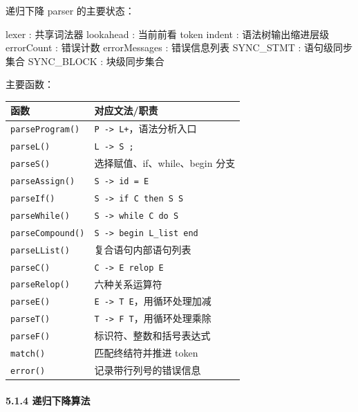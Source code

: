 \documentclass[
  a4paper,
  fontset=none,
]{ctexart}
\newenvironment{Shaded}{}{}
\newcommand{\NormalTok}[1]{#1}
\begin{document}
递归下降 parser 的主要状态：

\begin{Shaded}
\begin{Highlighting}[]
\NormalTok{lexer          : 共享词法器}
\NormalTok{lookahead      : 当前前看 token}
\NormalTok{indent         : 语法树输出缩进层级}
\NormalTok{errorCount     : 错误计数}
\NormalTok{errorMessages  : 错误信息列表}
\NormalTok{SYNC\_STMT      : 语句级同步集合}
\NormalTok{SYNC\_BLOCK     : 块级同步集合}
\end{Highlighting}
\end{Shaded}

主要函数：

\begin{longtable}[]{@{}ll@{}}
\toprule\noalign{}
函数 & 对应文法/职责 \\
\midrule\noalign{}
\endhead
\bottomrule\noalign{}
\endlastfoot
\texttt{parseProgram()} &
\texttt{P\ -\textgreater{}\ L+}，语法分析入口 \\
\texttt{parseL()} & \texttt{L\ -\textgreater{}\ S\ ;} \\
\texttt{parseS()} & 选择赋值、if、while、begin 分支 \\
\texttt{parseAssign()} & \texttt{S\ -\textgreater{}\ id\ =\ E} \\
\texttt{parseIf()} &
\texttt{S\ -\textgreater{}\ if\ C\ then\ S\ S\textquotesingle{}} \\
\texttt{parseWhile()} & \texttt{S\ -\textgreater{}\ while\ C\ do\ S} \\
\texttt{parseCompound()} &
\texttt{S\ -\textgreater{}\ begin\ L\_list\ end} \\
\texttt{parseLList()} & 复合语句内部语句列表 \\
\texttt{parseC()} & \texttt{C\ -\textgreater{}\ E\ relop\ E} \\
\texttt{parseRelop()} & 六种关系运算符 \\
\texttt{parseE()} &
\texttt{E\ -\textgreater{}\ T\ E\textquotesingle{}}，用循环处理加减 \\
\texttt{parseT()} &
\texttt{T\ -\textgreater{}\ F\ T\textquotesingle{}}，用循环处理乘除 \\
\texttt{parseF()} & 标识符、整数和括号表达式 \\
\texttt{match()} & 匹配终结符并推进 token \\
\texttt{error()} & 记录带行列号的错误信息 \\
\end{longtable}

\hypertarget{ux9012ux5f52ux4e0bux964dux7b97ux6cd5}{%
\paragraph{5.1.4
递归下降算法}\label{ux9012ux5f52ux4e0bux964dux7b97ux6cd5}}
\end{document}
